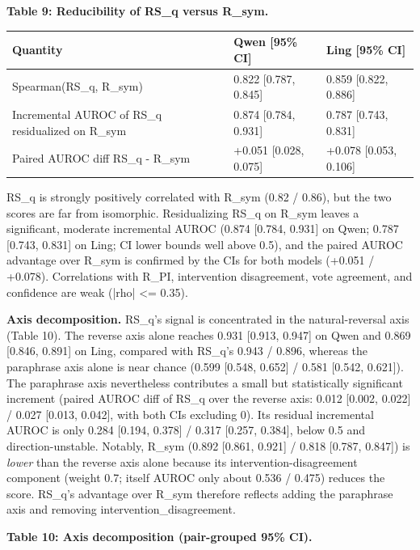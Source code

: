 \documentclass[11pt]{article}
\begin{document}
\textbf{Table 9: Reducibility of RS\_q versus R\_sym.}

\begin{table}[t]
\centering
\small
\begin{tabular}{lll}
\toprule
Quantity & Qwen [95\% CI] & Ling [95\% CI] \\
\midrule
Spearman(RS\_q, R\_sym) & 0.822 [0.787, 0.845] & 0.859 [0.822, 0.886] \\
Incremental AUROC of RS\_q residualized on R\_sym & 0.874 [0.784, 0.931] & 0.787 [0.743, 0.831] \\
Paired AUROC diff RS\_q - R\_sym & +0.051 [0.028, 0.075] & +0.078 [0.053, 0.106] \\
\bottomrule
\end{tabular}
\end{table}


RS\_q is strongly positively correlated with R\_sym (0.82 / 0.86), but the two scores are far from isomorphic. Residualizing RS\_q on R\_sym leaves a significant, moderate incremental AUROC (0.874 [0.784, 0.931] on Qwen; 0.787 [0.743, 0.831] on Ling; CI lower bounds well above 0.5), and the paired AUROC advantage over R\_sym is confirmed by the CIs for both models (+0.051 / +0.078). Correlations with R\_PI, intervention disagreement, vote agreement, and confidence are weak (|rho| <= 0.35).

\textbf{Axis decomposition.} RS\_q's signal is concentrated in the natural-reversal axis (Table 10). The reverse axis alone reaches 0.931 [0.913, 0.947] on Qwen and 0.869 [0.846, 0.891] on Ling, compared with RS\_q's 0.943 / 0.896, whereas the paraphrase axis alone is near chance (0.599 [0.548, 0.652] / 0.581 [0.542, 0.621]). The paraphrase axis nevertheless contributes a small but statistically significant increment (paired AUROC diff of RS\_q over the reverse axis: 0.012 [0.002, 0.022] / 0.027 [0.013, 0.042], with both CIs excluding 0). Its residual incremental AUROC is only 0.284 [0.194, 0.378] / 0.317 [0.257, 0.384], below 0.5 and direction-unstable. Notably, R\_sym (0.892 [0.861, 0.921] / 0.818 [0.787, 0.847]) is \emph{lower} than the reverse axis alone because its intervention-disagreement component (weight 0.7; itself AUROC only about 0.536 / 0.475) reduces the score. RS\_q's advantage over R\_sym therefore reflects adding the paraphrase axis and removing intervention\_disagreement.

\textbf{Table 10: Axis decomposition (pair-grouped 95\% CI).}
\end{document}
